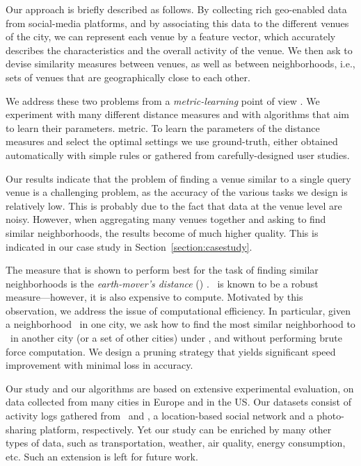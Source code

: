 \iffalse
Our approach is briefly described as follows.  By collecting rich geo-enabled
data from social-media platforms, and by associating this data to the different
venues of the city, we can represent each venue by a feature vector, which
accurately describes the characteristics and the overall activity of the venue.
We then ask to devise similarity measures between venues, as well as between
neighborhoods, i.e., sets of venues that are geographically close to each
other. 

We address these two problems from a {\em metric-learning} point of view
\cite{MetricSurvey13}.  We experiment with many different distance measures
and with algorithms that aim to learn their parameters. %
metric.  To learn the parameters of the distance measures and select the
optimal settings we use ground-truth, either obtained automatically with simple
rules or gathered from carefully-designed user studies. 

Our results indicate that the problem of finding a venue similar to a single
query venue is a challenging problem, as the accuracy of the various tasks we
design is relatively low.  This is probably due to the fact that data at the
venue level are noisy.  However, when aggregating many venues together and
asking to find similar neighborhoods, the results become of much higher
quality.  This is indicated in our case study in
Section~\ref{section:casestudy}.

The  measure that is shown to perform best for the task of finding similar
neighborhoods is the {\em earth-mover's distance} (\emd) \cite{EMD98}.  \emd\
is known to be a robust measure---however, it is also expensive to compute.
Motivated by this observation, we address the issue of computational
efficiency.  In particular,  given a neighborhood \region\ in one city, we ask
how to find the most similar neighborhood to \region\ in another city (or a set
of other cities) under \emd, and without performing brute force computation.
We design a pruning strategy that yields significant speed improvement with
minimal loss in accuracy. 

Our study and our algorithms are based on extensive experimental evaluation, on
data collected from many cities in Europe and in the US.  Our datasets consist
of activity logs gathered from \fs\ and \flickr, a location-based social
network and a photo-sharing platform, respectively.  Yet our study can be
enriched by many other types of data, such as transportation, weather, air
quality, energy consumption, etc.  Such an extension is left for future work.

